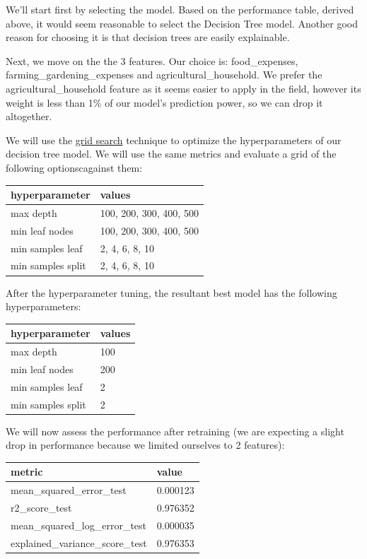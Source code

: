 \documentclass{article}
\begin{document}
We'll start first by selecting the model. Based on the performance table, derived above, it would seem reasonable to select the Decision Tree model. Another good reason for choosing it is that decision trees are easily explainable.

Next, we move on the the 3 features. Our choice is: food\_expenses, farming\_gardening\_expenses and agricultural\_household. We prefer the agricultural\_household feature as it seems easier to apply in the field, however its weight is less than 1\% of our model's prediction power, so we can drop it altogether.

We will use the \href{http://scikit-learn.org/stable/modules/generated/sklearn.model_selection.GridSearchCV.html}{grid search} technique to optimize the hyperparameters of our decision tree model. We will use the same metrics and evaluate a grid of the following optionscagainst them:

\begin{center}
\begin{tabular}{ |l|l| }
  \hline
  hyperparameter & values\\
  \hline
  max depth & 100, 200, 300, 400, 500\\
  min leaf nodes & 100, 200, 300, 400, 500\\
  min samples leaf & 2, 4, 6, 8, 10\\
  min samples split & 2, 4, 6, 8, 10\\
  \hline
\end{tabular}
\end{center}

After the hyperparameter tuning, the resultant best model has the following hyperparameters:

\begin{center}
\begin{tabular}{ |l|l| }
  \hline
  hyperparameter & values\\
  \hline
  max depth & 100\\
  min leaf nodes & 200\\
  min samples leaf & 2\\
  min samples split & 2\\
  \hline
\end{tabular}
\end{center}

We will now assess the performance after retraining (we are expecting a slight drop in performance because we limited ourselves to 2 features):

\begin{center}
\begin{tabular}{ |l|l| }
  \hline
  metric & value\\
  \hline
  mean\_squared\_error\_test & 0.000123\\
  r2\_score\_test & 0.976352\\
  mean\_squared\_log\_error\_test & 0.000035\\
  explained\_variance\_score\_test & 0.976353\\
  \hline
\end{tabular}
\end{center}
\end{document}
